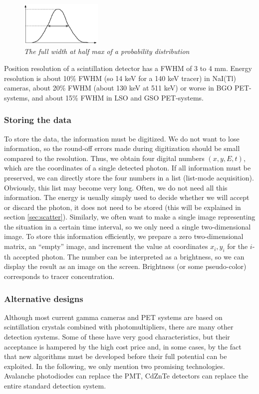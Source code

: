 \documentclass[11pt,oneside]{article}
\begin{document}
\begin{figure}[tb]
\centering
\includegraphics[width=0.35\textwidth]{figs/fig_fwhm.pdf}
\caption{\label{fig:fwhm} \emph{The full width at half max of a probability
distribution}}
\end{figure}

Position resolution of a scintillation detector has a FWHM of 3 to 4 mm.
Energy resolution is about 10\% FWHM (so 14 keV for a 140 keV tracer) in
NaI(Tl) cameras, about 20\% FWHM (about 130 keV at 511 keV) or worse in
BGO PET-systems, and about 15\% FWHM in LSO and GSO PET-systems.

\subsubsection{Storing the data} \label{sec:storing_data}
To store the data, the information must be digitized. We do not want to lose
information, so the round-off errors made during digitization should be small
compared to the resolution. Thus, we obtain four digital numbers $(x, y, E,
t)$, which are the coordinates of a single detected photon. If all information
must be preserved, we can directly store the four numbers in a list (list-mode
acquisition). Obviously, this list may become very long. Often, we do not need
all this information. The energy is usually simply used to decide whether we
will accept or discard the photon, it does not need to be stored (this will be
explained in section \ref{sec:scatter}). Similarly, we often want to
make a single image representing the situation in a certain time interval, so
we only need a single two-dimensional image. To store this information
efficiently, we prepare a zero two-dimensional matrix, an ``empty'' image, and
increment the value at coordinates $x_i, y_i$ for the $i$-th accepted
photon. The number can be interpreted as a brightness, so we can display the
result as an image on the screen. Brightness (or some pseudo-color)
corresponds to tracer concentration.


\subsubsection{Alternative designs}
Although most current gamma cameras and PET systems are based on
scintillation crystals combined with photomultipliers, there are many
other detection systems. Some of these have very good characteristics, but
their acceptance is hampered by the high cost price and, in some cases, by
the fact that new algorithms must be developed before their full potential
can be exploited. In the following, we only mention two promising
technologies. Avalanche photodiodes can replace the PMT, CdZnTe detectors
can replace the entire standard detection system.
\end{document}
